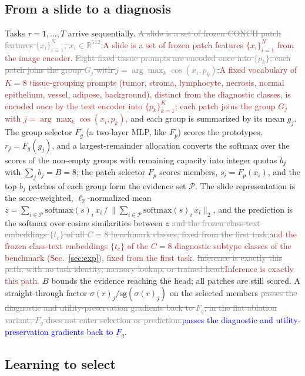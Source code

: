 \documentclass{article}
\newif\ifmarkup \markuptrue
\newcommand{\repc}[3]{\ifmarkup\textcolor{gray}{\sout{#2}}\textcolor{#1}{#3}\else#3\fi}
\newcommand{\repB}[2]{\repc{brown}{#1}{#2}}   %
\newcommand{\repL}[2]{\repc{blue}{#1}{#2}}    %
\newcommand{\Fg}{F_g}
\newcommand{\Fp}{F_p}
\newcommand{\Psel}{\mathcal{P}}
\begin{document}
\subsection{From a slide to a diagnosis}
\label{ssec:setup}

Tasks $\tau=1,\ldots,T$ arrive sequentially. \repB{A slide is a set of frozen CONCH patch features $\{x_i\}_{i=1}^{N}$, $x_i\in\mathbb{R}^{512}$.}{A slide is a set of frozen patch features $\{x_i\}_{i=1}^{N}$ from the image encoder.} \repB{Eight fixed tissue prompts are encoded once into $\{p_k\}$; each patch joins the group $G_j$ with $j=\arg\max_k\cos(x_i,p_k)$,}{A fixed vocabulary of $K=8$ tissue-grouping prompts (tumor, stroma, lymphocyte, necrosis, normal epithelium, vessel, adipose, background), distinct from the diagnostic classes, is encoded once by the text encoder into $\{p_k\}_{k=1}^{K}$; each patch joins the group $G_j$ with $j=\arg\max_k\cos(x_i,p_k)$,} and each group is summarized by its mean $g_j$. The group selector $\Fg$ (a two-layer MLP, like $\Fp$) scores the prototypes, $r_j=\Fg(g_j)$, and a largest-remainder allocation converts the softmax over the scores of the non-empty groups with remaining capacity into integer quotas $b_j$ with $\sum_j b_j=B=8$; the patch selector $\Fp$ scores members, $s_i=\Fp(x_i)$, and the top $b_j$ patches of each group form the evidence set $\Psel$. The slide representation is the score-weighted, $\ell_2$-normalized mean $z=\sum_{i\in\Psel}\mathrm{softmax}(s)_i\,x_i\,/\,\bigl\|\sum_{i\in\Psel}\mathrm{softmax}(s)_i\,x_i\bigr\|_2$, and the prediction is the softmax over cosine similarities between $z$ \repB{and the frozen class-text embeddings $\{t_c\}$ of all $C=8$ benchmark classes, fixed from the first task.}{and the frozen class-text embeddings $\{t_c\}$ of the $C=8$ diagnostic subtype classes of the benchmark (Sec.~\ref{sec:exp}), fixed from the first task.} \repB{Inference is exactly this path, with no task identity, memory lookup, or trained head.}{Inference is exactly this path.} $B$ bounds the evidence reaching the head; all patches are still scored. A straight-through factor $\sigma(r)_j/\mathrm{sg}(\sigma(r)_j)$ on the selected members \repL{passes the diagnostic and utility-preservation gradients back to $\Fg$; in the flat ablation variant, $\Fg$ does not enter selection or prediction.}{passes the diagnostic and utility-preservation gradients back to $\Fg$.}



\subsection{Learning to select}
\label{ssec:within}
\end{document}
